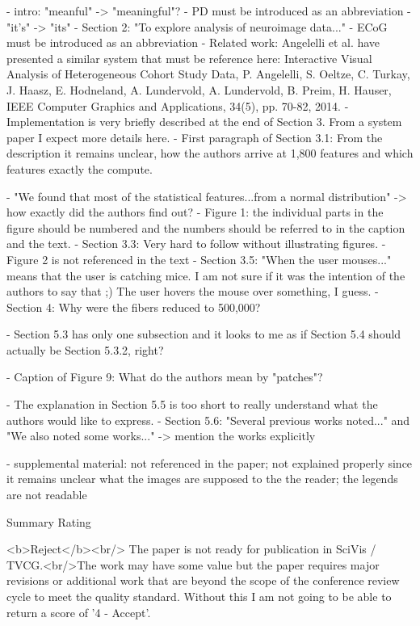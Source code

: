     - intro: "meanful" -> "meaningful"?  
    - PD must be introduced as an abbreviation  
    - "it's" -> "its"
    - Section 2: "To explore analysis of neuroimage data..." 
    - ECoG must be introduced as an abbreviation  
    - Related work: Angelelli et al. have presented a similar system that must be
    reference here: Interactive Visual Analysis of Heterogeneous Cohort Study Data, P.
    Angelelli, S. Oeltze, C. Turkay, J. Haasz, E. Hodneland, A. Lundervold, A.
    Lundervold, B. Preim, H. Hauser, IEEE Computer Graphics and Applications, 34(5),
    pp. 70-82, 2014.
    - Implementation is very briefly described at the end of Section 3. From a system
    paper I expect more details here.
    - First paragraph of Section 3.1: From the description it remains unclear, how the
    authors arrive at 1,800 features and which features exactly the compute.
    
    - "We found that most of the statistical features...from a normal distribution" ->
    how exactly did the authors find out? 
    -  Figure 1: the individual parts in the figure should be numbered and the numbers
    should be referred to in the caption and the text.
    - Section 3.3: Very hard to follow without illustrating figures.
    - Figure 2 is not referenced in the text
    - Section 3.5: "When the user mouses..." means that the user is catching mice. I
    am not sure if it was the intention of the authors to say that ;) The user hovers
    the mouse over something, I guess.  
    - Section 4: Why were the fibers reduced to 500,000?

    - Section 5.3 has only one subsection and it looks to me as if Section 5.4 should
    actually be Section 5.3.2, right?

    - Caption of Figure 9: What do the authors mean by "patches"?

    - The explanation in Section 5.5 is too short to really understand what the
    authors would like to express.
    - Section 5.6: "Several previous works noted..." and "We also noted some works..."
    -> mention the works explicitly
   
    - supplemental material: not referenced in the paper; not explained properly since
    it remains unclear what the images are supposed to the the reader; the legends are
    not readable

  Summary Rating

    <b>Reject</b><br/> The paper is not ready for publication in SciVis /
    TVCG.<br/>The work may have some value but the paper requires major revisions or
    additional work that are beyond the scope of the conference review cycle to meet
    the quality standard. Without this I am not going to be able to return a score of
    '4 - Accept'.

